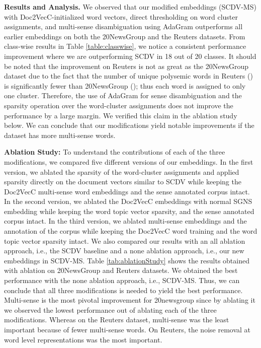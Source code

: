 \documentclass{ecai}
\begin{document}
\vspace{0.5em}
\noindent \textbf{Results and Analysis.} We observed that our modified embeddings (SCDV-MS) with Doc2VecC-initialized word vectors, direct thresholding on word cluster assignments, and multi-sense disambiguation using AdaGram outperforms all earlier embeddings on both the 20NewsGroup and the Reuters datasets. From class-wise results in Table \ref{table:classwise}, we notice a consistent performance improvement where we are outperforming SCDV in 18 out of 20 classes. It should be noted that the improvement on Reuters is not as great as the 20NewsGroup dataset due to the fact that the number of unique polysemic words in Reuters () is significantly fewer than 20NewsGroup (); thus each word is assigned to only one cluster. Therefore, the use of AdaGram for sense disambiguation and the sparsity operation over the word-cluster assignments does not improve the performance by a large margin. We verified this claim in the ablation study below. We can conclude that our modifications yield notable improvements if the dataset has more multi-sense words.

\vspace{0.5em}
\noindent \textbf{Ablation Study: } To understand the contributions of each of the three modifications, we compared five different versions of our embeddings. In the first version, we ablated the sparsity of the word-cluster assignments and applied sparsity directly on the document vectors similar to SCDV while keeping the Doc2VecC multi-sense word embeddings and the sense annotated corpus intact. In the second version, we ablated the Doc2VecC embeddings with normal SGNS embedding while keeping the word topic vector sparsity, and the sense annotated corpus intact. In the third version, we ablated multi-sense embeddings and the annotation of the corpus while keeping the Doc2VecC word training and the word topic vector sparsity intact. We also compared our results with an all ablation approach, i.e., the SCDV baseline and a none ablation approach, i.e., our new embeddings in SCDV-MS. Table \ref{tab:ablationStudy} shows the results obtained with ablation on 20NewsGroup and Reuters datasets. We obtained the best performance with the none ablation approach, i.e., SCDV-MS. Thus, we can conclude that all three modifications is needed to yield the best performance. Multi-sense is the most pivotal improvement for 20newsgroup since by ablating it we observed the lowest performance out of ablating each of the three modifications. Whereas on the Reuters dataset, multi-sense was the least important because of fewer multi-sense words. On Reuters, the noise removal at word level representations was the most important.
\end{document}
